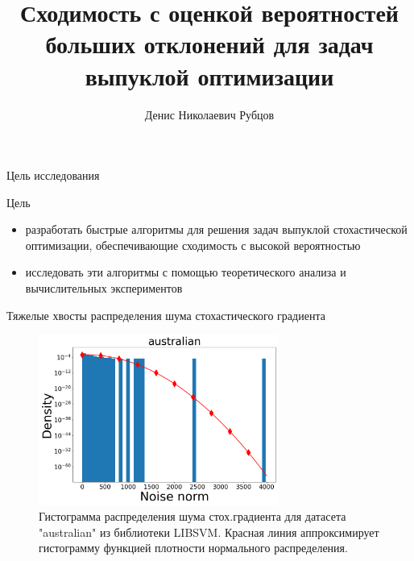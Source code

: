 \documentclass{beamer}
\title[\hbox to 56mm]{Сходимость с оценкой вероятностей больших отклонений для задач выпуклой оптимизации}
\author[Д.\,Н. Рубцов]{Денис Николаевич Рубцов}
\institute{Московский физико-технический институт}
\date{\footnotesize
\par\smallskip\emph{} 67-я Всероссийская научная конференция МФТИ
\par\smallskip\emph{} Секция проблем интеллектуального анализа данных, распознавания и прогнозирования
\par\smallskip\emph{Научный руководитель:} д.ф.-м.н. А.\,В.~Гасников

\par\bigskip\small 2025}
\begin{document}
\begin{frame}
\thispagestyle{empty}
\maketitle
\end{frame}
\begin{frame}{Цель исследования}
     \begin{block}{Цель}
     \begin{itemize}
         \item разработать быстрые алгоритмы для решения задач выпуклой стохастической оптимизации, обеспечивающие сходимость с высокой вероятностью
         \item исследовать эти алгоритмы с помощью теоретического анализа и вычислительных экспериментов
     \end{itemize}
     \end{block}

 \end{frame}

 \begin{frame}{Тяжелые хвосты распределения шума стохастического градиента}

\begin{figure}
\caption*{ Гистограмма распределения шума стох.градиента для датасета "australian" из библиотеки LIBSVM. Красная линия аппроксимирует гистограмму функцией плотности нормального распределения. }
\includegraphics[width=0.7\textwidth]{australian_heavy_tails.png}
\end{figure}
\end{frame}
\end{document}
